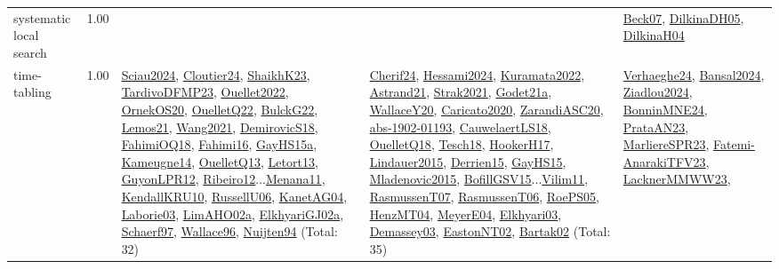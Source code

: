 {\begin{longtable}{p{3cm}r>{\raggedright\arraybackslash}p{6cm}>{\raggedright\arraybackslash}p{6cm}>{\raggedright\arraybackslash}p{8cm}}
\index{systematic local search}\index{Algorithms!systematic local search}systematic local search &  1.00 &  &  & \hyperref[detail:Beck07]{Beck07}, \hyperref[detail:DilkinaDH05]{DilkinaDH05}, \hyperref[detail:DilkinaH04]{DilkinaH04}\\
\index{time-tabling}\index{Algorithms!time-tabling}time-tabling &  1.00 & \hyperref[detail:Sciau2024]{Sciau2024}, \hyperref[detail:Cloutier24]{Cloutier24}, \hyperref[detail:ShaikhK23]{ShaikhK23}, \hyperref[detail:TardivoDFMP23]{TardivoDFMP23}, \hyperref[detail:Ouellet2022]{Ouellet2022}, \hyperref[detail:OrnekOS20]{OrnekOS20}, \hyperref[detail:OuelletQ22]{OuelletQ22}, \hyperref[detail:BulckG22]{BulckG22}, \hyperref[detail:Lemos21]{Lemos21}, \hyperref[detail:Wang2021]{Wang2021}, \hyperref[detail:DemirovicS18]{DemirovicS18}, \hyperref[detail:FahimiOQ18]{FahimiOQ18}, \hyperref[detail:Fahimi16]{Fahimi16}, \hyperref[detail:GayHS15a]{GayHS15a}, \hyperref[detail:Kameugne14]{Kameugne14}, \hyperref[detail:OuelletQ13]{OuelletQ13}, \hyperref[detail:Letort13]{Letort13}, \hyperref[detail:GuyonLPR12]{GuyonLPR12}, \hyperref[detail:Ribeiro12]{Ribeiro12}...\hyperref[detail:Menana11]{Menana11}, \hyperref[detail:KendallKRU10]{KendallKRU10}, \hyperref[detail:RussellU06]{RussellU06}, \hyperref[detail:KanetAG04]{KanetAG04}, \hyperref[detail:Laborie03]{Laborie03}, \hyperref[detail:LimAHO02a]{LimAHO02a}, \hyperref[detail:ElkhyariGJ02a]{ElkhyariGJ02a}, \hyperref[detail:Schaerf97]{Schaerf97}, \hyperref[detail:Wallace96]{Wallace96}, \hyperref[detail:Nuijten94]{Nuijten94} (Total: 32) & \hyperref[detail:Cherif24]{Cherif24}, \hyperref[detail:Hessami2024]{Hessami2024}, \hyperref[detail:Kuramata2022]{Kuramata2022}, \hyperref[detail:Astrand21]{Astrand21}, \hyperref[detail:Strak2021]{Strak2021}, \hyperref[detail:Godet21a]{Godet21a}, \hyperref[detail:WallaceY20]{WallaceY20}, \hyperref[detail:Caricato2020]{Caricato2020}, \hyperref[detail:ZarandiASC20]{ZarandiASC20}, \hyperref[detail:abs-1902-01193]{abs-1902-01193}, \hyperref[detail:CauwelaertLS18]{CauwelaertLS18}, \hyperref[detail:OuelletQ18]{OuelletQ18}, \hyperref[detail:Tesch18]{Tesch18}, \hyperref[detail:HookerH17]{HookerH17}, \hyperref[detail:Lindauer2015]{Lindauer2015}, \hyperref[detail:Derrien15]{Derrien15}, \hyperref[detail:GayHS15]{GayHS15}, \hyperref[detail:Mladenovic2015]{Mladenovic2015}, \hyperref[detail:BofillGSV15]{BofillGSV15}...\hyperref[detail:Vilim11]{Vilim11}, \hyperref[detail:RasmussenT07]{RasmussenT07}, \hyperref[detail:RasmussenT06]{RasmussenT06}, \hyperref[detail:RoePS05]{RoePS05}, \hyperref[detail:HenzMT04]{HenzMT04}, \hyperref[detail:MeyerE04]{MeyerE04}, \hyperref[detail:Elkhyari03]{Elkhyari03}, \hyperref[detail:Demassey03]{Demassey03}, \hyperref[detail:EastonNT02]{EastonNT02}, \hyperref[detail:Bartak02]{Bartak02} (Total: 35) & \hyperref[detail:Verhaeghe24]{Verhaeghe24}, \hyperref[detail:Bansal2024]{Bansal2024}, \hyperref[detail:Ziadlou2024]{Ziadlou2024}, \hyperref[detail:BonninMNE24]{BonninMNE24}, \hyperref[detail:PrataAN23]{PrataAN23}, \hyperref[detail:MarliereSPR23]{MarliereSPR23}, \hyperref[detail:Fatemi-AnarakiTFV23]{Fatemi-AnarakiTFV23}, \hyperref[detail:LacknerMMWW23]{LacknerMMWW23}, 
\end{longtable}}
